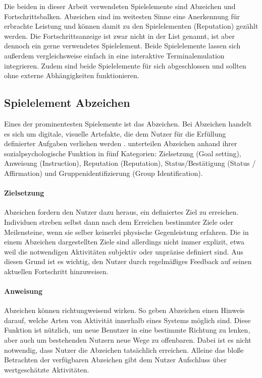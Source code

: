 Die beiden in dieser Arbeit verwendeten Spielelemente sind Abzeichen und Fortschrittsbalken. Abzeichen sind im weitesten Sinne eine Anerkennung für erbrachte Leistung und können damit zu den  Spielelementen (Reputation) gezählt werden. Die Fortschrittsanzeige ist zwar nicht in der List genannt, ist aber dennoch ein gerne verwendetes Spielelement. Beide Spielelemente lassen sich außerdem vergleichsweise einfach in eine interaktive Terminalemulation integrieren. Zudem sind beide Spielelemente für sich abgeschlossen und sollten ohne externe Abhängigkeiten funktionieren.


\subsection{Spielelement Abzeichen}
Eines der prominentesten Spielemente ist das Abzeichen. Bei Abzeichen handelt es sich um digitale, visuelle Artefakte, die dem Nutzer für die Erfüllung definierter Aufgaben verliehen werden \cite{antin_badges_2011}. \citeauthor{antin_badges_2011} unterteilen Abzeichen anhand ihrer sozialpsychologische Funktion in fünf Kategorien: Zielsetzung (Goal setting), Anweisung (Instruction), Reputation (Reputation),
Status/Bestätigung (Status / Affirmation) und Gruppenidentifizierung (Group Identification). 


\paragraph{Zielsetzung}
Abzeichen fordern den Nutzer dazu heraus, ein definiertes Ziel zu erreichen. Individuen streben selbst dann nach dem Erreichen bestimmter Ziele oder Meilensteine, wenn sie selber keinerlei physische Gegenleistung erfahren. Die in einem Abzeichen dargestellten Ziele sind allerdings nicht immer explizit, etwa weil die notwendigen Aktivitäten subjektiv oder unpräzise definiert sind. Aus diesen Grund ist es wichtig, den Nutzer durch regelmäßiges Feedback auf seinen aktuellen Fortschritt hinzuweisen. 

\paragraph{Anweisung}
Abzeichen können richtungweisend wirken. So geben Abzeichen einen Hinweis darauf, welche Arten von Aktivität innerhalb eines Systems möglich sind. Diese Funktion ist nützlich, um neue Benutzer in eine bestimmte Richtung zu lenken, aber auch um bestehenden Nutzern neue Wege zu offenbaren. Dabei ist es nicht notwendig, dass Nutzer die Abzeichen tatsächlich erreichen. Alleine das bloße Betrachten der verfügbaren Abzeichen gibt dem Nutzer Aufschluss über wertgeschätzte Aktivitäten.

